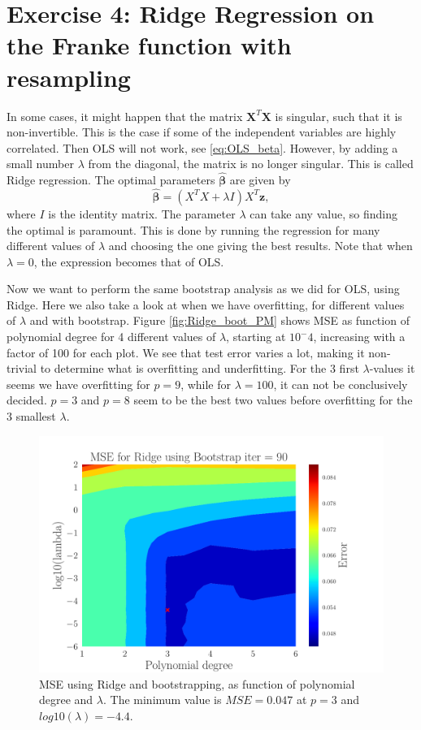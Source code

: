 \documentclass[reprint,english,notitlepage,aps,nobalancelastpage,nofootinbib]{revtex4-1}  %
\newcommand{\vc}[1]{\mathbf{#1}}
\begin{document}
\section*{Exercise 4: Ridge Regression on the Franke function with resampling}
In some cases, it might happen that the matrix $\mathbf{X}^T\mathbf{X}$ is singular, such that it is non-invertible. This is the case if some of the independent variables are highly correlated. Then OLS will not work, see \eqref{eq:OLS_beta}. However, by adding a small number $\lambda$ from the diagonal, the matrix is no longer singular. This is called Ridge regression. The optimal parameters $\boldsymbol{\hat\beta}$ are given by
\begin{equation}
	\boldsymbol{\hat{\beta}} = (X^TX+\lambda I)X^T\vc{z},
\end{equation}
where $I$ is  the identity matrix. The parameter $\lambda$ can take any value, so finding the optimal is paramount. This is done by running the regression for many different values of $\lambda$ and choosing the one giving the best results.  Note that when $\lambda=0$, the expression becomes that of OLS.

Now we want to perform the same bootstrap analysis as we did for OLS, using Ridge. Here we also take a look at when we have overfitting, for different values of $\lambda$ and with bootstrap. Figure \ref{fig:Ridge_boot_PM} shows MSE as function of polynomial degree for 4 different values of $\lambda$, starting at $10^-4$, increasing with a factor of 100 for each plot. We see that test error varies a lot, making it non-trivial to determine what is overfitting and underfitting. For the 3 first $\lambda$-values it seems we have overfitting for $p=9$, while for $\lambda=100$, it can not be conclusively decided. $p=3$ and $p=8$ seem to be the best two values before overfitting for the 3 smallest $\lambda$.

\begin{figure}[H]
	\includegraphics[width=\linewidth]{Contour_PL_Ridge_Bootstrap90_n30_eps0.2_p1_6_lmb2_m6.pdf}
	\caption{MSE using Ridge and bootstrapping, as function of polynomial degree and $\lambda$. The minimum value is $MSE=0.047$ at $p=3$ and $log10(\lambda) = -4.4$.}
	\label{fig:Ridge-boot_heatmap}
\end{figure}
\end{document}
